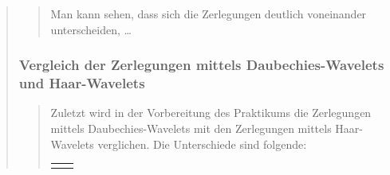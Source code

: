 \begin{quote}
\begin{quote}
                
            Man kann sehen, dass sich die Zerlegungen deutlich voneinander
            unterscheiden, \ldots 
                
                
        \end{quote}%
        
        
        \subsubsection{Vergleich der Zerlegungen mittels
        Daubechies-Wavelets und Haar-Wavelets}
        \begin{quote}
        
        Zuletzt wird in der Vorbereitung des Praktikums die Zerlegungen mittels
        Daubechies-Wavelets mit den Zerlegungen mittels Haar-Wavelets
        verglichen. Die Unterschiede sind folgende:
        
        \begin{center}
                \begin{tabular}{ll}
    
                \hspace{-12em}
                    \begin{minipage}{0.6\textwidth}
    

\end{minipage}
\end{tabular}
\end{center}
\end{quote}
\end{quote}
